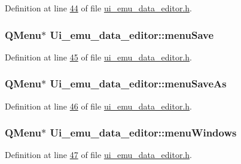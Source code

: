 Definition at line \hyperlink{a00051_source_l00044}{44} of file \hyperlink{a00051_source}{ui\+\_\+emu\+\_\+data\+\_\+editor.\+h}.

\hypertarget{a00026_a36a184d4c55f5de1b542257cbe23adaf}{
\subsubsection[{menu\+Save}]{\setlength{\rightskip}{0pt plus 5cm}Q\+Menu$\ast$ Ui\+\_\+emu\+\_\+data\+\_\+editor\+::menu\+Save}}\label{a00026_a36a184d4c55f5de1b542257cbe23adaf}


Definition at line \hyperlink{a00051_source_l00045}{45} of file \hyperlink{a00051_source}{ui\+\_\+emu\+\_\+data\+\_\+editor.\+h}.

\hypertarget{a00026_a2568794cbc6cc9907104efbfd79eba7d}{
\subsubsection[{menu\+Save\+As}]{\setlength{\rightskip}{0pt plus 5cm}Q\+Menu$\ast$ Ui\+\_\+emu\+\_\+data\+\_\+editor\+::menu\+Save\+As}}\label{a00026_a2568794cbc6cc9907104efbfd79eba7d}


Definition at line \hyperlink{a00051_source_l00046}{46} of file \hyperlink{a00051_source}{ui\+\_\+emu\+\_\+data\+\_\+editor.\+h}.

\hypertarget{a00026_a0c7cba2d30d21689f48f1981e976c0b6}{
\subsubsection[{menu\+Windows}]{\setlength{\rightskip}{0pt plus 5cm}Q\+Menu$\ast$ Ui\+\_\+emu\+\_\+data\+\_\+editor\+::menu\+Windows}}\label{a00026_a0c7cba2d30d21689f48f1981e976c0b6}


Definition at line \hyperlink{a00051_source_l00047}{47} of file \hyperlink{a00051_source}{ui\+\_\+emu\+\_\+data\+\_\+editor.\+h}.

